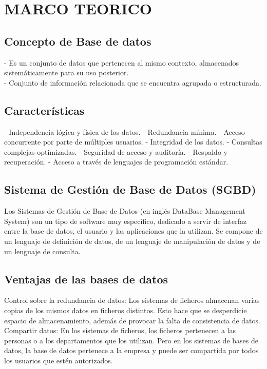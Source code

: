 \section{MARCO TEORICO}
\subsection{Concepto de Base de datos}
- Es un conjunto de datos que pertenecen al mismo contexto, almacenados sistemáticamente para su uso posterior.\\
- Conjunto de información relacionada que se encuentra agrupada o estructurada.

\subsection{Características}
- Independencia lógica y física de los datos.
- Redundancia mínima.
- Acceso concurrente por parte de múltiples usuarios.
- Integridad de los datos.
- Consultas complejas optimizadas.
- Seguridad de acceso y auditoría.
- Respaldo y recuperación.
- Acceso a través de lenguajes de programación estándar. 

\subsection{Sistema de Gestión de Base de Datos (SGBD)}
Los Sistemas de Gestión de Base de Datos (en inglés DataBase Management System) son un tipo de software muy específico, dedicado a servir de interfaz entre la base de datos, el usuario y las aplicaciones que la utilizan. Se compone de un lenguaje de definición de datos, de un lenguaje de manipulación de datos y de un lenguaje de consulta.

\subsection{Ventajas de las bases de datos}
Control sobre la redundancia de datos: Los sistemas de ficheros almacenan varias copias de los mismos datos en ficheros distintos. Esto hace que se desperdicie espacio de almacenamiento, además de provocar la falta de consistencia de datos.\\

Compartir datos: En los sistemas de ficheros, los ficheros pertenecen a las personas o a los departamentos que los utilizan. Pero en los sistemas de bases de datos, la base de datos pertenece a la empresa y puede ser compartida por todos los usuarios que estén autorizados.\\

